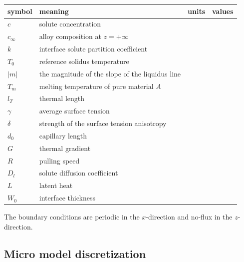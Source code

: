 \documentclass[a4paper,12pt]{article}
\begin{document}
\begin{table}
\centering
\begin{tabular}{l l c c }
\toprule
symbol & meaning & units & values\\
\midrule
$c$ & solute concentration &  & \\
$c_{\infty}$ & alloy composition at $z = +\infty$ &  & \\
$k$ & interface solute partition coefficient &  &\\
$T_0$ & reference solidus temperature &  &\\
$|m|$ & the magnitude of the slope of the liquidus line &  &\\
$T_m$ & melting temperature of pure material $A$ &  &\\
$l_T$ & thermal length &  &\\
$\gamma$ &  average surface tension &  & \\
$\delta$ & strength of the surface tension anisotropy  &  &\\
$d_0$ & capillary length &  & \\
$G$ & thermal gradient &  & \\
$R$ & pulling speed &  & \\
$D_l$ & solute diffusion coefficient &  & \\
$L$ & latent heat &  & \\
$W_0$ & interface thickness  &  & \\
\bottomrule
\end{tabular}
\end{table}

The boundary conditions are periodic in the $x$-direction and no-flux in the $z$-direction.


\subsection{Micro model discretization}
\end{document}
